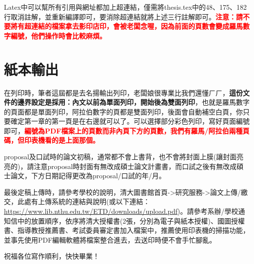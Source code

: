 Latex中可以幫所有引用與網址都加上超連結，僅需將thesis.tex中的48、175、182行取消註解，並重新編譯即可，要消除超連結就將上述三行註解即可。\textbf{\textcolor{red}{注意：請不要將有超連結的檔案拿去影印店印，會被老闆念喔，因為前面的頁數會變成羅馬數字編號，他們操作時會比較麻煩。}}

\section{紙本輸出}

在列印時，筆者這屆都是去名揚輸出列印，老闆娘很專業比我們還懂ㄏㄏ，\textbf{這份文件的邊界設定是採用：內文以前為單面列印，開始後為雙面列印}，也就是羅馬數字的頁面都是單面列印，阿拉伯數字的頁都是雙面列印，後面會自動補空白頁，你只要確定第一章的第一頁是在右邊就可以了。可以選擇部分彩色列印，寫好頁面編號即可，\textbf{\textcolor{red}{編號為PDF檔案上的頁數而非內頁下方的頁數，我們有羅馬/阿拉伯兩種頁碼，但印表機看的是上面那個。}}

proposal及口試時的論文初稿，通常都不會上書背，也不會將封面上膜(讓封面亮亮的)，請注意proposal時封面有無改成碩士論文計畫書，而口試之後有無改成碩士論文，下方日期記得更改為proposal/口試的年/月。

最後定稿上傳時，請參考學校的說明，清大圖書館首頁->研究服務->論文上傳/繳交，此處有上傳系統的連結與說明(或以下連結：\url{https://www.lib.nthu.edu.tw/ETD/downloads/upload.pdf})。請參考系辦/學校通知信中的放置順序，依序將清大授權書(2張，分別為電子與紙本授權)、國圖授權書、指導教授推薦書、考試委員審定書加入檔案中，推薦使用印表機的掃描功能，並事先使用PDF編輯軟體將檔案整合進去，去送印時便不會手忙腳亂。

祝福各位寫作順利，快快畢業！